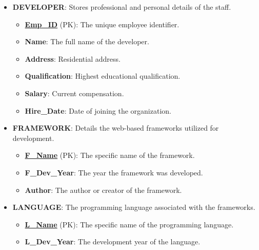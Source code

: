 \documentclass[12pt,a3paper]{article}
\begin{document}
\begin{enumerate}
\begin{tcolorbox}[enhanced,breakable,ansbox,colback=cA!4,colframe=cA,boxrule=0.8pt,arc=5pt,title={\textbf{Answer}},fonttitle=\bfseries\color{white},colbacktitle=cA]
\begin{itemize}[leftmargin=2em, itemsep=0.5em]
    \item \textbf{DEVELOPER}: Stores professional and personal details of the staff.
    \begin{itemize}[label={--}, itemsep=1pt]
        \item \underline{\textbf{Emp\_ID}} (PK): The unique employee identifier.
        \item \textbf{Name}: The full name of the developer.
        \item \textbf{Address}: Residential address.
        \item \textbf{Qualification}: Highest educational qualification.
        \item \textbf{Salary}: Current compensation.
        \item \textbf{Hire\_Date}: Date of joining the organization.
    \end{itemize}

    \item \textbf{FRAMEWORK}: Details the web-based frameworks utilized for development.
    \begin{itemize}[label={--}, itemsep=1pt]
        \item \underline{\textbf{F\_Name}} (PK): The specific name of the framework.
        \item \textbf{F\_Dev\_Year}: The year the framework was developed.
        \item \textbf{Author}: The author or creator of the framework.
    \end{itemize}

    \item \textbf{LANGUAGE}: The programming language associated with the frameworks.
    \begin{itemize}[label={--}, itemsep=1pt]
        \item \underline{\textbf{L\_Name}} (PK): The specific name of the programming language.
        \item \textbf{L\_Dev\_Year}: The development year of the language.
    \end{itemize}
\end{itemize}


\end{tcolorbox}
\end{enumerate}
\end{document}
